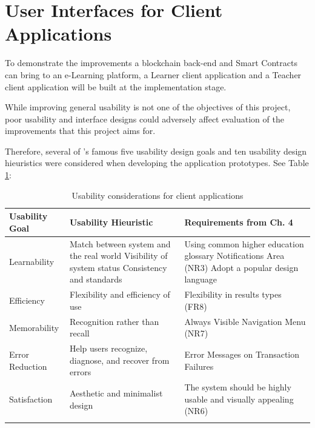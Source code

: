 \section{User Interfaces for Client Applications}

To demonstrate the improvements a blockchain back-end and Smart Contracts can bring to an e-Learning platform, a
Learner client application and a Teacher client application will be built at the implementation stage.

While improving general usability is not one of the objectives of this project, poor usability and interface designs
could adversely affect evaluation of the improvements that this project aims for.

Therefore, several of \citet{nielsen199510}'s famous five usability design goals and ten usability design hieuristics
were considered when developing the application prototypes. See Table \ref{table:ux_considerations}:

\begin{table}[!ht]
	\caption{Usability considerations for client applications}
	\centering
	\label{table:ux_considerations}
	\begin{tabularx}{\textwidth}{lXX}
		Usability Goal            & Usability Hieuristic                                    & Requirements from Ch. 4  \\
		\toprule
		Learnability              & Match between system and the real world\newline
		Visibility of system status \newline
		Consistency and standards & Using common higher education glossary \newline
		Notifications Area (NR3) \newline
		Adopt a popular design language                                                                                              \\
		\midrule
		Efficiency                & Flexibility and efficiency of use   & Flexibility in results types (FR8)                             \\
		\midrule
		Memorability              & Recognition rather than recall                          & Always Visible Navigation Menu (NR7)     \\
		\midrule
		Error Reduction        & Help users recognize, diagnose, and recover from errors & Error Messages on Transaction Failures \\
		\midrule
		Satisfaction              & Aesthetic and minimalist design   & The system should be highly usable and visually appealing (NR6) \\                                                               \\
		\bottomrule
	\end{tabularx}
\end{table}

